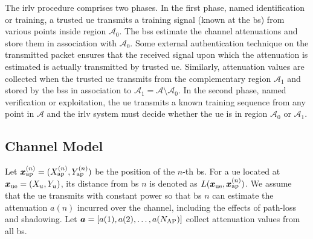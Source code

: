 \documentclass[conference,final]{IEEEtran}
\begin{document}
The \ac{irlv} procedure comprises two phases. In the first phase, named identification or training, a trusted \ac{ue} transmits a training signal (known at the \acs{bs}) from various points inside region $\mathcal{A}_0$.  The \acp{bs} estimate the channel attenuations and store them in association with $\mathcal{A}_0$. Some external authentication technique on the transmitted packet  ensures that the received signal upon which the attenuation is estimated is actually transmitted by trusted \ac{ue}. Similarly, attenuation values are collected when the trusted \ac{ue} transmits  from the complementary region $\mathcal{A}_1$ and  stored by the \acp{bs} in association to $\mathcal{A}_1 = \mathcal{A} \setminus \mathcal{A}_0$. In the second  phase, named verification or exploitation, the \ac{ue} transmits a known training sequence from any point in $\mathcal{A}$ and the \ac{irlv} system must decide whether the \ac{ue} is in region $\mathcal{A}_0$ or $\mathcal{A}_1$.


\subsection{Channel Model}

Let $\bm{x}_{\rm ap}^{(n)} =(X_{\rm ap}^{(n)},Y_{\rm ap}^{(n)})$ be the position of the $n$-th \ac{bs}. For a \ac{ue} located at $\bm{x}_{\rm ue}=(X_u,Y_u)$, its distance from \ac{bs} $n$ is denoted as $L(\bm{x}_{\rm ue},\bm{x}_{\rm ap}^{(n)})$. We assume that  the \ac{ue} transmits with constant power so that  \ac{bs} $n$ can estimate the attenuation $a{(n)}$ incurred over the channel, including the effects of path-loss and shadowing. Let $\bm a = [a(1), a(2), \ldots, a(N_{\rm AP})]$ collect attenuation values from all \ac{bs}.
\end{document}
